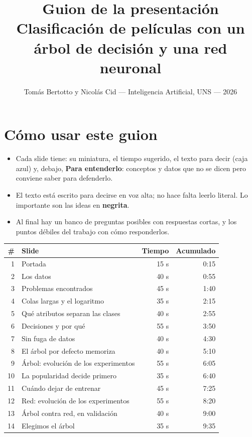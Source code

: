 \documentclass[11pt,a4paper]{article}
\title{\vspace{-1.5cm}\textbf{Guion de la presentación}\\[3pt]
\large Clasificación de películas con un árbol de decisión y una red neuronal}
\author{\normalsize Tomás Bertotto y Nicolás Cid --- Inteligencia Artificial, UNS --- 2026}
\date{}
\begin{document}
\maketitle
\vspace{-1cm}

\indice

\section{Cómo usar este guion}

\begin{itemize}
  \item Cada slide tiene: su miniatura, el tiempo sugerido, el texto para decir (caja azul) y, debajo,
        \textbf{Para entenderlo}: conceptos y datos que no se dicen pero conviene saber para defenderlo.
  \item El texto está escrito para decirse en voz alta; no hace falta leerlo literal. Lo importante son
        las ideas en \textbf{negrita}.
  \item Al final hay un banco de preguntas posibles con respuestas cortas, y los puntos débiles del
        trabajo con cómo responderlos.
\end{itemize}

\begin{center}
\small
\begin{tabularx}{\linewidth}{@{}r X r r@{}}
\toprule
\# & Slide & Tiempo & Acumulado \\
\midrule
1  & Portada                               & 15 s & 0:15 \\
2  & Los datos                             & 40 s & 0:55 \\
3  & Problemas encontrados                 & 45 s & 1:40 \\
4  & Colas largas y el logaritmo           & 35 s & 2:15 \\
5  & Qué atributos separan las clases      & 40 s & 2:55 \\
6  & Decisiones y por qué                  & 55 s & 3:50 \\
7  & Sin fuga de datos                     & 40 s & 4:30 \\
8  & El árbol por defecto memoriza         & 40 s & 5:10 \\
9  & Árbol: evolución de los experimentos  & 55 s & 6:05 \\
10 & La popularidad decide primero         & 35 s & 6:40 \\
11 & Cuándo dejar de entrenar              & 45 s & 7:25 \\
12 & Red: evolución de los experimentos    & 55 s & 8:20 \\
13 & Árbol contra red, en validación       & 40 s & 9:00 \\
14 & Elegimos el árbol                     & 35 s & 9:35 \\
\bottomrule
\end{tabularx}
\end{center}
\end{document}
